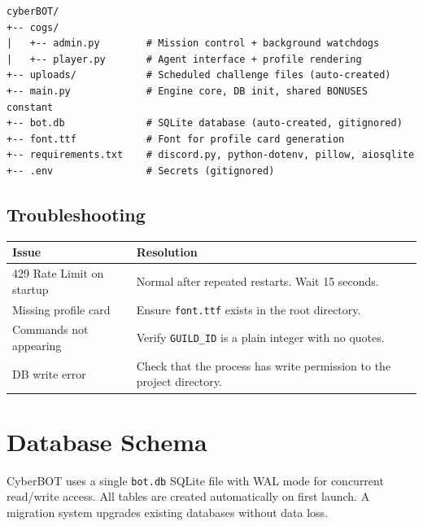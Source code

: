 \documentclass[12pt,a4paper]{report}
\begin{document}
\begin{tcolorbox}[colback=codebg, colframe=cybercyan!60]
\begin{verbatim}
cyberBOT/
+-- cogs/
|   +-- admin.py        # Mission control + background watchdogs
|   +-- player.py       # Agent interface + profile rendering
+-- uploads/            # Scheduled challenge files (auto-created)
+-- main.py             # Engine core, DB init, shared BONUSES constant
+-- bot.db              # SQLite database (auto-created, gitignored)
+-- font.ttf            # Font for profile card generation
+-- requirements.txt    # discord.py, python-dotenv, pillow, aiosqlite
+-- .env                # Secrets (gitignored)
\end{verbatim}
\end{tcolorbox}

\newpage
\section{Troubleshooting}

\begin{center}
\begin{tabular}{p{4.2cm} p{8.8cm}}
\toprule
\textbf{Issue} & \textbf{Resolution} \\
\midrule
429 Rate Limit on startup  & Normal after repeated restarts. Wait 15 seconds. \\
Missing profile card       & Ensure \texttt{font.ttf} exists in the root directory. \\
Commands not appearing     & Verify \texttt{GUILD\_ID} is a plain integer with no quotes. \\
DB write error             & Check that the process has write permission to the project directory. \\
\bottomrule
\end{tabular}
\end{center}

\chapter{Database Schema}

CyberBOT uses a single \texttt{bot.db} SQLite file with WAL mode for concurrent read/write access.
All tables are created automatically on first launch. A migration system upgrades existing databases
without data loss.
\end{document}
